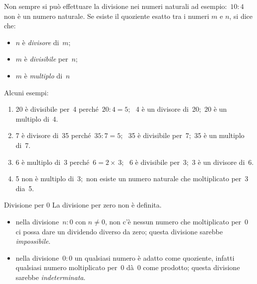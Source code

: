 \vspace{.5em}
Non sempre si può effettuare la divisione nei numeri naturali ad 
esempio:~\(10 : 4\) non è un numero naturale.
Se esiste il quoziente esatto tra i numeri \(m\) e \(n\), si dice che:

\begin{htmulticols}{3}
\begin{itemize} [noitemsep]
 \item \(n\) è \emph{divisore} di~\(m\);
 \item \(m\) è \emph{divisibile} per~\(n\);
 \item \(m\) è \emph{multiplo} di~\(n\)
\end{itemize}
\end{htmulticols}

\begin{esempio}{}{}
Alcuni esempi:
\begin{enumerate} [left=0mm, noitemsep]
\item 20 è divisibile per~4 perché~\(20:4=5\);~
4 è un divisore di~20;~20 è un multiplo di~4.
\item 7 è divisore di~35 perché~\(35:7=5\);~ 
35 è divisibile per~7;~35 è un multiplo di~7.
\item 6 è multiplo di~3 perché~\(6=2\times~3\);~
6 è divisibile per~3;~3 è un divisore di~6.
\item 5 non è multiplo di~3;~non esiste un numero naturale che moltiplicato 
per~3 dia~5.
\end{enumerate}
\end{esempio}

\begin{osservazioni}{Divisione per 0}{}
La divisione per zero non è definita.
\begin{itemize}[nosep]
\item nella divisione~\(n:0\) con \(n\neq 0\), non c'è nessun numero che 
moltiplicato per~0 ci possa dare un dividendo diverso da zero; 
questa divisione sarebbe \emph{impossibile}.
\item nella divisione~\(0:0\) un qualsiasi numero è adatto come quoziente, 
infatti qualsiasi numero moltiplicato per~0 dà~0 come prodotto; 
questa divisione sarebbe \emph{indeterminata}.
\end{itemize}
\end{osservazioni}


